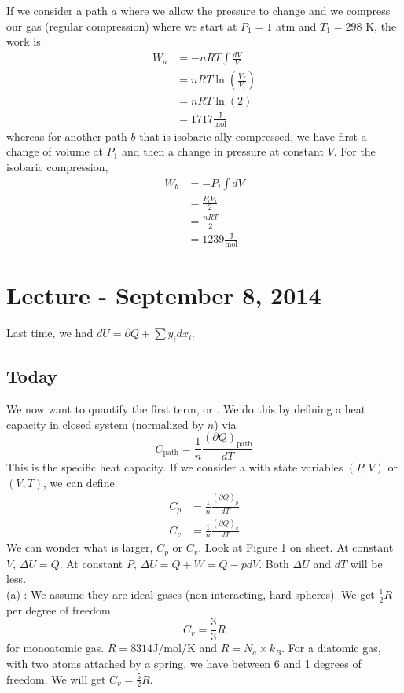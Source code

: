 \documentclass[12pt]{article}
\begin{document}
If we consider a path $a$ where we allow the pressure to change and we compress our gas (regular compression) where we start at $P_1 = 1$ atm and $T_1 = 298$ K, the work is
\begin{align*}
W_a &= -nRT\int \frac{dV}{V}\\
&= nRT \ln(\frac{V_f}{V_i})\\
&= nRT \ln(2)\\
&= 1717 \frac{\text{J}}{\text{mol}}
\end{align*}
whereas for another path $b$ that is isobaric-ally compressed, we have first a change of volume at $P_1$ and then a change in pressure at constant $V$.  For the isobaric compression,
\begin{align*}
W_b &= -P_i \int dV\\
&= \frac{P_i V_i}{2}\\
&= \frac{nRT}{2}\\
&= 1239 \frac{\text{J}}{\text{mol}}
\end{align*}

\section{Lecture - September 8, 2014}
Last time, we had $dU = \partial Q + \sum y_i dx_i$.  
\subsection{Today}
We now want to quantify the first term, or .  We do this by defining a heat capacity in closed system (normalized by $n$) via
\begin{equation}
C_\text{path} = \frac{1}{n} \frac{(\partial Q)_\text{path}}{dT}
\end{equation}
This is the specific heat capacity.  If we consider a  with state variables $(P,V)$ or $(V,T)$, we can define
\begin{align*}
C_p &= \frac{1}{n} \frac{(\partial Q)_p}{dT}\\
C_v &=  \frac{1}{n} \frac{(\partial Q)_v}{dT}
\end{align*}
We can wonder what is larger, $C_p$ or $C_v$.  Look at Figure 1 on sheet.  At constant $V$, $\Delta U = Q$.  At constant $P$, $\Delta U = Q + W = Q - p dV$.  Both $\Delta U$ and $dT$ will be less.\\

(a) : We assume they are ideal gases (non interacting, hard spheres).  We get $\frac{1}{2} R$ per degree of freedom.
\begin{equation}
C_v = \frac{3}{3} R
\end{equation}
for monoatomic gas.  $R = 8314 \text{J}/\text{mol}/\text{K}$ and $R = N_a \times k_B$.  For a diatomic gas, with two atoms attached by a spring, we have between 6 and 1 degrees of freedom.  We will get $C_v = \frac{5}{2} R$.
\end{document}
